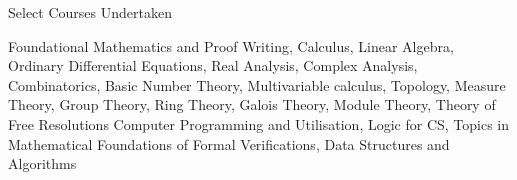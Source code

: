 \begin{rubric}{Select Courses Undertaken}

\entry*[Mathematics]
Foundational Mathematics and Proof Writing, Calculus, Linear Algebra, Ordinary Differential Equations, Real Analysis, Complex Analysis, Combinatorics, Basic Number Theory, Multivariable calculus, Topology, Measure Theory, Group Theory, Ring Theory, Galois Theory, Module Theory, Theory of Free Resolutions
%
 Computer Programming and Utilisation, Logic for CS, Topics in Mathematical Foundations of Formal Verifications, Data Structures and Algorithms
\end{rubric}